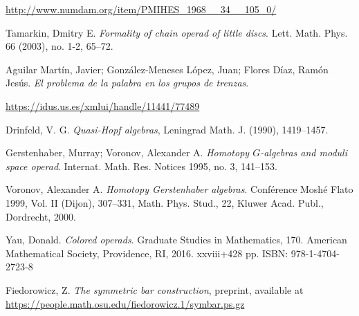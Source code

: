 \documentclass[TFM.tex]{subfiles}
\begin{document}
\begin{thebibliography}{}
 \url{http://www.numdam.org/item/PMIHES_1968__34__105_0/} %


 Tamarkin, Dmitry E. \emph{Formality of chain operad of little discs}. Lett. Math. Phys. 66 (2003), no. 1-2, 65–72. 


 Aguilar Martín, Javier; González-Meneses López, Juan; Flores Díaz, Ramón Jesús. \emph{El problema de la palabra en los grupos de trenzas}.

 \url{https://idus.us.es/xmlui/handle/11441/77489}
 

 
 Drinfeld, V. G. \emph{Quasi-Hopf algebras}, Leningrad Math. J. (1990), 1419–1457.

  Gerstenhaber, Murray; Voronov, Alexander A. \emph{Homotopy $G$-algebras and moduli space operad}. Internat. Math. Res. Notices 1995, no. 3, 141–153.

 Voronov, Alexander A. \emph{Homotopy Gerstenhaber algebras}. Conférence Moshé Flato 1999, Vol. II (Dijon), 307–331, Math. Phys. Stud., 22, Kluwer Acad. Publ., Dordrecht, 2000.


 Yau, Donald. \emph{Colored operads}. Graduate Studies in Mathematics, 170. American Mathematical Society, Providence, RI, 2016. xxviii+428 pp. ISBN: 978-1-4704-2723-8


 Fiedorowicz, Z. \emph{The symmetric bar construction}, preprint, available at \url{https://people.math.osu.edu/fiedorowicz.1/symbar.ps.gz}









\end{thebibliography}
\end{document}
